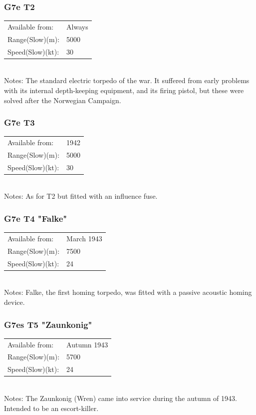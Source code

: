 \documentclass{article}
\begin{document}
\subsubsection{G7e T2}
\begin{tabular}{l|l}
Available from:& Always\\
Range(Slow)(m):& 5000\\
Speed(Slow)(kt):& 30\\
\end{tabular} \\
Notes:
The standard electric torpedo of the war. It suffered from early problems with its internal depth-keeping equipment, and its firing pistol, but these were solved after the Norwegian Campaign. \cite{uboatnetTorpedoes}

\subsubsection{G7e T3}
\begin{tabular}{l|l}
Available from:& 1942\\
Range(Slow)(m):& 5000\\
Speed(Slow)(kt):& 30\\
\end{tabular} \\
Notes:
As for T2 but fitted with an influence fuse. \cite{uboatnetTorpedoes}

\subsubsection{G7e T4 "Falke"}
\begin{tabular}{l|l}
Available from:& March 1943\\
Range(Slow)(m):& 7500\\
Speed(Slow)(kt):& 24\\
\end{tabular} \\
Notes:
Falke, the first homing torpedo, was fitted with a passive acoustic homing device. \cite{uboatnetTorpedoes}


\subsubsection{G7es T5 "Zaunkonig"}
\begin{tabular}{l|l}
Available from:& Autumn 1943\\
Range(Slow)(m):& 5700\\
Speed(Slow)(kt):& 24\\
\end{tabular} \\
Notes:
The Zaunkonig (Wren) came into service during the autumn of 1943. Intended to be an escort-killer. \cite{uboatnetTorpedoes}
\end{document}
